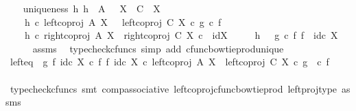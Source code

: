 \begin{isabellebody}
\ \ \isamarkupfalse%
\ uniqueness{\isacharcolon}{\kern0pt}\ {\isachardoublequoteopen}{\isasymforall}h{\isachardot}{\kern0pt}\ h\ {\isacharcolon}{\kern0pt}\ A\ {\isasymCoprod}\ \ X\ {\isasymrightarrow}\ C\ {\isasymCoprod}\ X\ {\isasymand}\isanewline
\ \ \ \ h\ {\isasymcirc}\isactrlsub c\ left{\isacharunderscore}{\kern0pt}coproj\ A\ X\ \ {\isacharequal}{\kern0pt}\ left{\isacharunderscore}{\kern0pt}coproj\ C\ X\ {\isasymcirc}\isactrlsub c\ {\isacharparenleft}{\kern0pt}g\ {\isasymcirc}\isactrlsub c\ f{\isacharparenright}{\kern0pt}\ {\isasymand}\isanewline
\ \ \ \ h\ {\isasymcirc}\isactrlsub c\ right{\isacharunderscore}{\kern0pt}coproj\ A\ X\ {\isacharequal}{\kern0pt}\ right{\isacharunderscore}{\kern0pt}coproj\ C\ X\ {\isasymcirc}\isactrlsub c\ \ id{\isacharparenleft}{\kern0pt}X{\isacharparenright}{\kern0pt}\ {\isasymlongrightarrow}\isanewline
\ \ \ \ h\ {\isacharequal}{\kern0pt}\ \ {\isacharparenleft}{\kern0pt}g\ {\isasymcirc}\isactrlsub c\ f{\isacharparenright}{\kern0pt}\ {\isasymbowtie}\isactrlsub f\ \ id\isactrlsub c\ X{\isachardoublequoteclose}\isanewline
\ \ \ \ \isamarkupfalse%
\ assms\ \isamarkupfalse%
\ {\isacharparenleft}{\kern0pt}typecheck{\isacharunderscore}{\kern0pt}cfuncs{\isacharcomma}{\kern0pt}\ simp\ add{\isacharcolon}{\kern0pt}\ cfunc{\isacharunderscore}{\kern0pt}bowtie{\isacharunderscore}{\kern0pt}prod{\isacharunderscore}{\kern0pt}unique{\isacharparenright}{\kern0pt}\isanewline
\isanewline
\ \ \isamarkupfalse%
\ left{\isacharunderscore}{\kern0pt}eq{\isacharcolon}{\kern0pt}\ {\isachardoublequoteopen}\ {\isacharparenleft}{\kern0pt}{\isacharparenleft}{\kern0pt}g\ {\isasymbowtie}\isactrlsub f\ id\isactrlsub c\ X{\isacharparenright}{\kern0pt}\ {\isasymcirc}\isactrlsub c\ {\isacharparenleft}{\kern0pt}f\ {\isasymbowtie}\isactrlsub f\ id\isactrlsub c\ X{\isacharparenright}{\kern0pt}{\isacharparenright}{\kern0pt}\ {\isasymcirc}\isactrlsub c\ left{\isacharunderscore}{\kern0pt}coproj\ A\ X\ {\isacharequal}{\kern0pt}\ left{\isacharunderscore}{\kern0pt}coproj\ C\ X\ {\isasymcirc}\isactrlsub c\ {\isacharparenleft}{\kern0pt}g\ \ {\isasymcirc}\isactrlsub c\ f{\isacharparenright}{\kern0pt}{\isachardoublequoteclose}\isanewline
\ \ \ \ \isamarkupfalse%
\ {\isacharparenleft}{\kern0pt}typecheck{\isacharunderscore}{\kern0pt}cfuncs{\isacharcomma}{\kern0pt}\ smt\ comp{\isacharunderscore}{\kern0pt}associative{}\ left{\isacharunderscore}{\kern0pt}coproj{\isacharunderscore}{\kern0pt}cfunc{\isacharunderscore}{\kern0pt}bowtie{\isacharunderscore}{\kern0pt}prod\ left{\isacharunderscore}{\kern0pt}proj{\isacharunderscore}{\kern0pt}type\ assms{\isacharparenright}{\kern0pt}\isanewline

\end{isabellebody}
